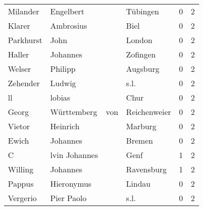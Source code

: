 \begin{tabular}{llllrr}
                 Milander &                          Engelbert &             &                                    Tübingen &          0 &         2 \\
                   Klarer &                          Ambrosius &             &                                        Biel &          0 &         2 \\
                Parkhurst &                               John &             &                                      London &          0 &         2 \\
                   Haller &                           Johannes &             &                                    Zofingen &          0 &         2 \\
                   Welser &                            Philipp &             &                                    Augsburg &          0 &         2 \\
                 Zehender &                             Ludwig &             &                                        s.l. &          0 &         2 \\
                       ll &                             lobias &             &                                        Chur &          0 &         2 \\
                    Georg &                        Württemberg &         von &                                Reichenweier &          0 &         2 \\
                   Vietor &                           Heinrich &             &                                     Marburg &          0 &         2 \\
                    Ewich &                           Johannes &             &                                      Bremen &          0 &         2 \\
                        C &                      lvin Johannes &             &                                        Genf &          1 &         2 \\
                  Willing &                           Johannes &             &                                  Ravensburg &          1 &         2 \\
                   Pappus &                         Hieronymus &             &                                      Lindau &          0 &         2 \\
                 Vergerio &                         Pier Paolo &             &                                        s.l. &          0 &         2 \\

\end{tabular}
